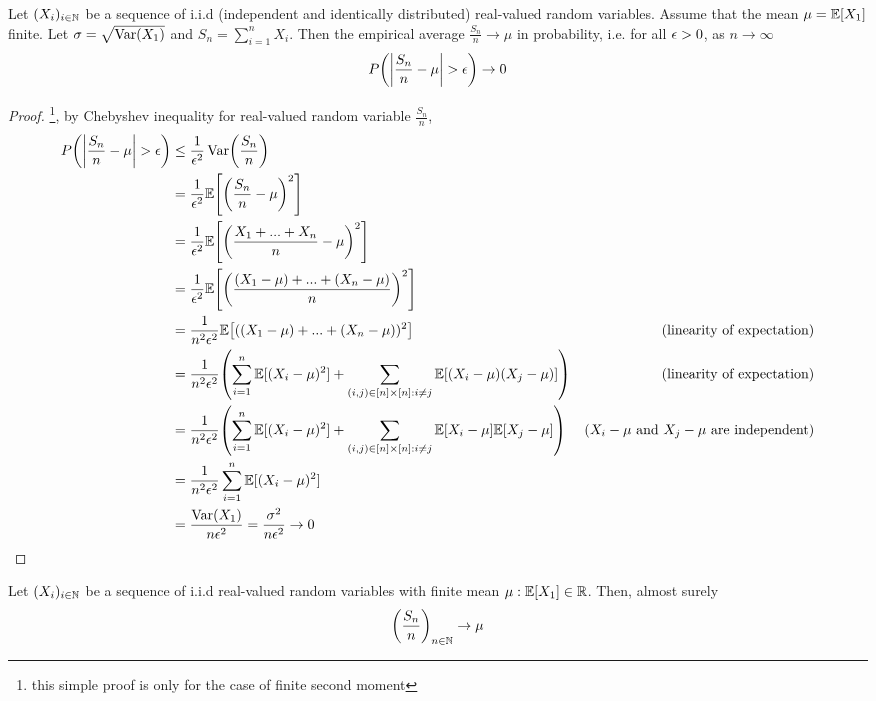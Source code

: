 \documentclass{report}
\begin{document}
\begin{theorem}
    Let $(X_i)_{i \in \N}$ be a sequence of i.i.d (independent and identically distributed) real-valued random variables. Assume that the mean $\mu = \Exp[X_1]$ finite. Let $\sigma = \sqrt{\Var(X_1)}$ and $S_n = \sum_{i=1}^n X_i$. Then the empirical average $\frac{S_n}{n} \to \mu$ in probability, i.e. for all $\eps > 0$, as $n \to \infty$
    $$
        P\tuple*{\abs*{\frac{S_n}{n} - \mu} > \eps} \to 0
    $$

    
\end{theorem}

\begin{proof}
     \footnote{this simple proof is only for the case of finite second moment}, by Chebyshev inequality for real-valued random variable $\frac{S_n}{n}$,
    \begin{align*}
        P\tuple*{\abs*{\frac{S_n}{n} - \mu} > \eps}
        &\leq \frac{1}{\eps^2} \Var\tuple*{\frac{S_n}{n}} \\
        &= \frac{1}{\eps^2} \Exp\bracket*{\tuple*{\frac{S_n}{n} - \mu}^2} \\
        &= \frac{1}{\eps^2} \Exp\bracket*{\tuple*{\frac{X_1 + ... + X_n}{n} - \mu}^2} \\
        &= \frac{1}{\eps^2} \Exp\bracket*{\tuple*{\frac{(X_1 -\mu) + ... + (X_n -\mu)}{n}}^2} \\
        &= \frac{1}{n^2 \eps^2} \Exp\bracket*{((X_1 -\mu) + ... + (X_n -\mu))^2} &\text{(linearity of expectation)}\\
        &= \frac{1}{n^2 \eps^2} \tuple*{\sum_{i=1}^n\Exp[(X_i - \mu)^2] + \sum_{(i, j) \in [n] \times [n]: i \neq j} \Exp[(X_i - \mu) (X_j - \mu)]} &\text{(linearity of expectation)}\\
        &= \frac{1}{n^2 \eps^2} \tuple*{\sum_{i=1}^n\Exp[(X_i - \mu)^2] + \sum_{(i, j) \in [n] \times [n]: i \neq j} \Exp[X_i - \mu] \Exp[X_j - \mu]} &\text{($X_i - \mu$ and $X_j - \mu$ are independent)}\\
        &= \frac{1}{n^2 \eps^2} \sum_{i=1}^n\Exp[(X_i - \mu)^2] \\
        &= \frac{\Var(X_1)}{n \eps^2} = \frac{\sigma^2}{n \eps^2} \to 0
    \end{align*}
\end{proof}

\begin{theorem}
    Let $(X_i)_{i \in \N}$ be a sequence of i.i.d real-valued random variables with finite mean $\mu: \Exp[X_1] \in \R$. Then, almost surely
    $$
        \tuple*{\frac{S_n}{n}}_{n \in \N} \to \mu
    $$
\end{theorem}
\end{document}
